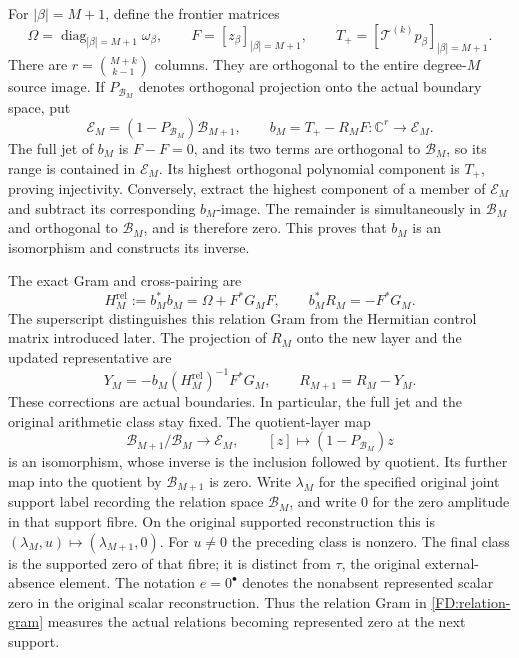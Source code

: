 For \(|\beta|=M+1\), define the frontier matrices
\begin{equation}
\Omega=\operatorname{diag}_{|\beta|=M+1}\omega_\beta,\qquad
F=[z_\beta]_{|\beta|=M+1},\qquad
T_+=[\mathcal T^{(k)}p_\beta]_{|\beta|=M+1}.
\tag{FD.11}\label{FD:frontier}
\end{equation}
There are \(r=\binom{M+k}{k-1}\) columns.  They are orthogonal to the
entire degree-\(M\) source image.  If \(P_{\mathcal B_M}\) denotes
orthogonal projection onto the actual boundary space, put
\begin{equation}
\mathcal E_M=(1-P_{\mathcal B_M})\mathcal B_{M+1},\qquad
b_M=T_+-R_MF:\mathbb C^r\longrightarrow\mathcal E_M.
\tag{FD.12}\label{FD:boundary-map}
\end{equation}
The full jet of \(b_M\) is \(F-F=0\), and its two terms are orthogonal
to \(\mathcal B_M\), so its range is contained in \(\mathcal E_M\).
Its highest orthogonal polynomial component is \(T_+\), proving
injectivity.  Conversely, extract the highest component of a member of
\(\mathcal E_M\) and subtract its corresponding \(b_M\)-image.  The
remainder is simultaneously in \(\mathcal B_M\) and orthogonal to
\(\mathcal B_M\), and is therefore zero.  This proves that \(b_M\) is
an isomorphism and constructs its inverse.

The exact Gram and cross-pairing are
\begin{equation}
H_M^{\mathrm{rel}}:=b_M^*b_M=\Omega+F^*G_MF,
\qquad b_M^*R_M=-F^*G_M.
\tag{FD.13}\label{FD:relation-gram}
\end{equation}
The superscript distinguishes this relation Gram from the Hermitian
control matrix introduced later.  The projection of \(R_M\) onto the
new layer and the updated representative are
\begin{equation}
Y_M=-b_M(H_M^{\mathrm{rel}})^{-1}F^*G_M,
\qquad R_{M+1}=R_M-Y_M.
\tag{FD.14}\label{FD:representative-update}
\end{equation}
These corrections are actual boundaries.  In particular, the full jet and
the original arithmetic class stay fixed.  The quotient-layer map
\[
\mathcal B_{M+1}/\mathcal B_M\longrightarrow\mathcal E_M,
\qquad [z]\longmapsto(1-P_{\mathcal B_M})z
\]
is an isomorphism, whose inverse is the inclusion followed by quotient.
Its further map into the quotient by \(\mathcal B_{M+1}\) is zero.
Write \(\lambda_M\) for the specified original joint support label
recording the relation space \(\mathcal B_M\), and write \(0\) for
the zero amplitude in that support fibre.  On the original supported
reconstruction this is
\((\lambda_M,u)\mapsto(\lambda_{M+1},0)\).  For \(u\ne0\) the preceding
class is nonzero.  The final class is the supported zero of that fibre;
it is distinct from \(\tau\), the original external-absence element.
The notation \(e=0^\bullet\) denotes the nonabsent represented scalar
zero in the original scalar reconstruction.  Thus the relation Gram
in \eqref{FD:relation-gram} measures the actual relations becoming
represented zero at the next support.

